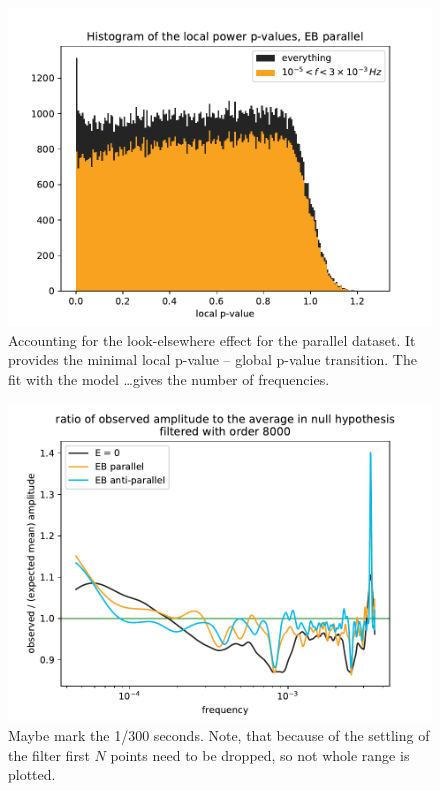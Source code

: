 \begin{figure}
  \centering
  \includegraphics[width=0.9\linewidth]{gfx/axions/P_p-values.pdf}
  \caption{Accounting for the look-elsewhere effect for the parallel dataset. It provides the minimal local p-value -- global p-value transition. The fit with the model \dots gives the number of frequencies. }\label{fig:axions_P_p-values}
\end{figure}

\begin{figure}
  \centering
  \includegraphics[width=0.9\linewidth]{gfx/axions/observed-predicted_power_ratio_filtered.pdf}
  \caption{Maybe mark the 1/300 seconds. Note, that because of the settling of the filter first $N$ points need to be dropped, so not whole range is plotted.}
  \label{fig:axions_observed-predicted_power_ratio_filtered}
\end{figure}



